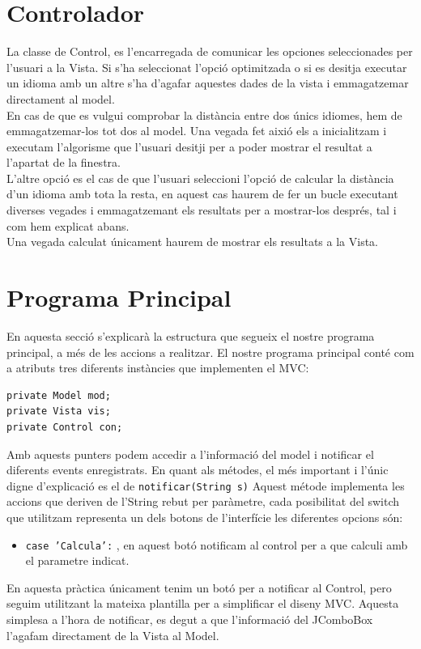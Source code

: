\documentclass[conference]{IEEEtran}
\begin{document}
\section{Controlador}
La classe de Control, es l'encarregada de comunicar les opciones seleccionades per l'usuari a la Vista. Si s'ha seleccionat l'opció optimitzada o si es desitja executar un idioma amb un altre s'ha d'agafar aquestes dades de la vista i emmagatzemar directament al model. \\
En cas de que es vulgui comprobar la distància entre dos únics idiomes, hem de emmagatzemar-los tot dos al model. Una vegada fet aixió els a inicialitzam i executam l'algorisme que l'usuari desitji per a poder mostrar el resultat a l'apartat de la finestra.\\
L'altre opció es el cas de que l'usuari seleccioni l'opció de calcular la distància d'un idioma amb tota la resta, en aquest cas haurem de fer un bucle executant diverses vegades i emmagatzemant els resultats per a mostrar-los després, tal i com hem explicat abans.
\\ Una vegada calculat únicament haurem de mostrar els resultats a la Vista.

\section{Programa Principal}
 En aquesta secció s'explicarà la estructura que segueix el nostre programa principal, a més de les accions a realitzar. El nostre programa principal conté com a atributs tres diferents instàncies que implementen el MVC:
\begin{verbatim}
private Model mod;
private Vista vis;
private Control con;
\end{verbatim}
    Amb aquests punters podem accedir a l'informació del model i notificar el diferents events enregistrats. En quant als métodes, el més important i l'únic digne d'explicació es el de \texttt{notificar(String s)} Aquest métode implementa les accions que deriven de l'String rebut per paràmetre, cada posibilitat del switch que utilitzam representa un dels botons de l'interfície les diferentes opcions són:
    \begin{itemize}
        \item \texttt{case 'Calcula':} , en aquest botó notificam al control per a que calculi amb el parametre indicat.\\
    \end{itemize}
    En aquesta pràctica únicament tenim un botó per a notificar al Control, pero seguim utilitzant la mateixa plantilla per a simplificar el diseny MVC. Aquesta simplesa a l'hora de notificar, es degut a que l'informació del JComboBox l'agafam directament de la Vista al Model.
\end{document}
